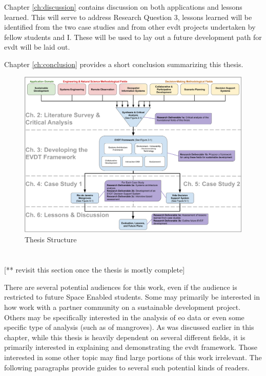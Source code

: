 Chapter \ref{ch:discussion} contains discussion on both applications and lessons learned. This will serve to address Research Question 3, lessons learned will be identified from the two case studies and from other \ac{evdt} projects undertaken by fellow students and I. These will be used to lay out a future development path for \ac{evdt} will be laid out.

Chapter \ref{ch:conclusion} provides a short conclusion summarizing this thesis.

\clearpage
\begin{landscape}
\begin{figure}[t]
	\centering
	\includegraphics[scale=0.3]{Figures/chap1/structure.png}
	\caption[Thesis Structure]{Thesis Structure}
	\label{fig:structure}
\end{figure}
\end{landscape}
 

\section{} \label{sec:audiences}

[** revisit this section once the thesis is mostly complete]

There are several potential audiences for this work, even if the audience is restricted to future Space Enabled students. Some may primarily be interested in how work with a partner community on a sustainable development project. Others may be specifically interested in the analysis of \ac{eo} data or even some specific type of analysis (such as of mangroves). As was discussed earlier in this chapter, while this thesis is heavily dependent on several different fields, it is primarily interested in explaining and demonstrating the \ac{evdt} framework. Those interested in some other topic may find large portions of this work irrelevant. The following paragraphs provide guides to several such potential kinds of readers. 

